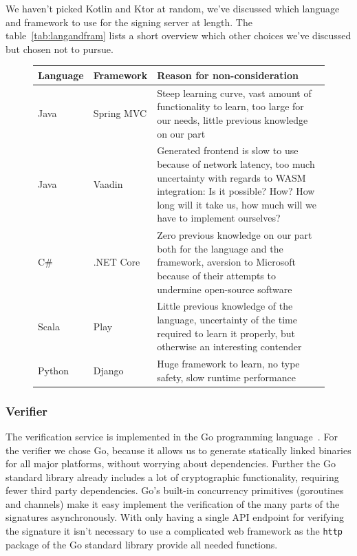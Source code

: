 We haven't picked Kotlin and Ktor at random, we've discussed which language and framework to use for the signing server at length.
The table~\ref{tab:langandfram} lists a short overview which other choices we've discussed but chosen not to pursue.

\begin{figure}
    \begin{center}
        \begin{tabular}{p{1.5cm}|p{2cm}|p{11cm}}
            \textbf{Language} & \textbf{Framework} & \textbf{Reason for non-consideration} \\
            \hline
            Java & Spring MVC & Steep learning curve, vast amount of functionality to learn, too large for our needs, little previous knowledge on our part \\
            \hline
            Java & Vaadin & Generated frontend is slow to use because of network latency, too much uncertainty with regards to \gls{WASM} integration: Is it possible? How? How long will it take us, how much will we have to implement ourselves? \\
            \hline
            C\# & .NET Core & Zero previous knowledge on our part both for the language and the framework, aversion to Microsoft because of their attempts to undermine open-source software~\cite{mseee} \\
            \hline
            Scala & Play & Little previous knowledge of the language, uncertainty of the time required to learn it properly, but otherwise an interesting contender \\
            \hline
            Python & Django & Huge framework to learn, no type safety, slow runtime performance \\
        \end{tabular}
    \end{center}
\end{figure}


\subsubsection{Verifier}
The verification service is implemented in the Go programming language~\cite{golang}.
For the verifier we chose Go,
because it allows us to generate statically linked binaries for all major platforms,
without worrying about dependencies.
Further the Go standard library already includes a lot of cryptographic functionality,
requiring fewer third party dependencies.
Go's built-in concurrency primitives (goroutines and channels) make it easy implement the verification of the many parts of the signatures asynchronously.
With only having a single \gls{API} endpoint for verifying the signature it isn't necessary to use a complicated web framework as the \texttt{http} package of the Go standard library provide all needed functions.

